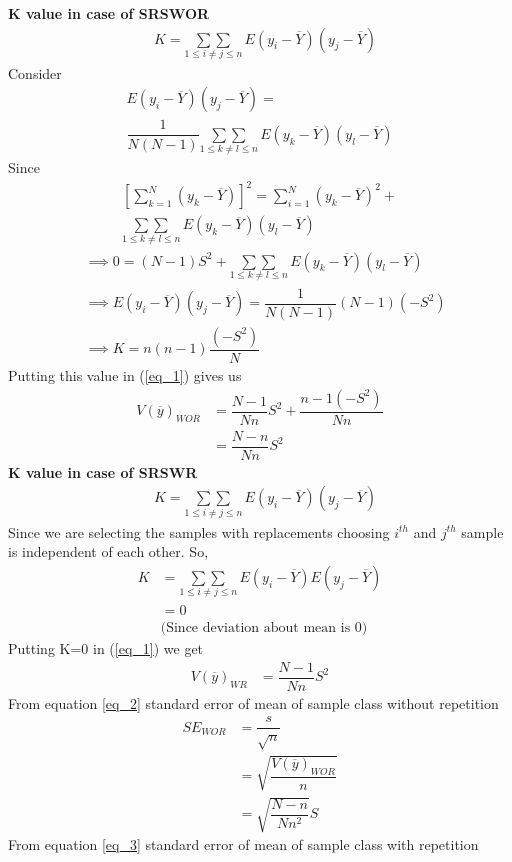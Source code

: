 \documentclass[journal,12pt,twocolumn]{IEEEtran}
\begin{document}
\vspace{0.5 cm}
\textbf{K value in case of SRSWOR}
\begin{align*}
&K=\underset{1\leq i\neq j\leq n}{\sum\sum}\, E(y_i-\overline{Y})(y_j-\overline{Y})
\end{align*}
Consider
\begin{multline*}
E(y_i-\overline{Y})(y_j-\overline{Y})= \\
\dfrac{1}{N(N-1)}\underset{1\leq k\neq l\leq n}{\sum\sum}\, E(y_k-\overline{Y})(y_l-\overline{Y})
\end{multline*}
Since
\begin{multline*}
\left[\sum_{k=1}^N(y_k-\overline{Y})\right]^2=\sum_{i=1}^{N}(y_k-\overline{Y})^2+\\
\underset{1\leq k\neq l\leq n}{\sum\sum}\, E(y_k-\overline{Y})(y_l-\overline{Y})
\end{multline*}
\begin{align*}
&\implies 0 = (N-1)S^2+\underset{1\leq k\neq l\leq n}{\sum\sum}\, E(y_k-\overline{Y})(y_l-\overline{Y})\\
& \implies E(y_i-\overline{Y})(y_j-\overline{Y})=\dfrac{1}{N(N-1)}(N-1)(-S^2)\\
& \implies K = n(n-1)\dfrac{(-S^2)}{N}
\end{align*}
Putting this value in (\ref{eq_1}) gives us 
\begin{align}
V(\overline{y})_{WOR} & = \dfrac{N-1}{Nn} S^2+ \dfrac{n-1(-S^2)}{Nn}\\
& = \dfrac{N-n}{Nn} S^2 \label{eq_2}
\end{align}
\textbf{K value in case of SRSWR}
\begin{align*}
&K=\underset{1\leq i\neq j\leq n}{\sum\sum}\, E(y_i-\overline{Y})(y_j-\overline{Y})
\end{align*}
Since we are selecting the samples with replacements choosing $i^{th}$ and $j^{th}$ sample is independent of each other. So,
\begin{align*}
K&=\underset{1\leq i\neq j\leq n}{\sum\sum}\, E(y_i-\overline{Y})E(y_j-\overline{Y})\\
& = 0\\
& \text{(Since deviation about mean is 0)}
\end{align*}
Putting K=0 in (\ref{eq_1}) we get 
\begin{align}
V(\overline{y})_{WR} & = \dfrac{N-1}{Nn} S^2\label{eq_3}
\end{align}
From equation \eqref{eq_2}  standard error of mean of sample class without repetition
\begin{align}
{SE}_{WOR} & = \dfrac{s}{\sqrt{n}}\\
& = \sqrt{\dfrac{V(\overline{y})_{WOR}}{n}}\\
& = \sqrt{\dfrac{N-n}{Nn^2}}S \label{eq_4}
\end{align} 
From equation \eqref{eq_3}  standard error of mean of sample class with repetition
\end{document}
